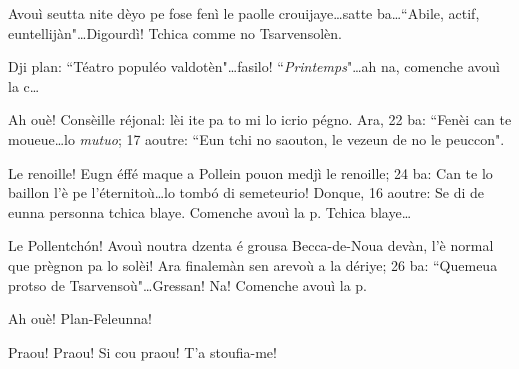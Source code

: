 


\DramPer


 

\begin{drama}

\Laurentspeaks Avouì seutta nite dèyo pe fose fenì le paolle crouijaye\ldots satte ba\ldots ``Abile, actif, euntellijàn"\ldots Digourdì! Tchica comme no Tsarvensolèn.


\Laurentspeaks Dji plan: ``Téatro populéo valdotèn"\ldots fasilo! ``\textit{Printemps}"\ldots ah na, comenche avouì la c\ldots


\Laurentspeaks Ah ouè! \og Consèille réjonal\fg: lèi ite pa to mi lo icrio pégno. Ara, 22 ba: ``Fenèi can te moueue\ldots lo \textit{mutuo}; 17 aoutre: ``Eun tchi no saouton, le vezeun de no le peuccon".


\Laurentspeaks Le renoille! Eugn éffé maque a Pollein pouon medjì le renoille; 24 ba: \og Can te lo baillon l'è pe l'éternitoù\fg\ldots lo tomb\'o di semeteurio! Donque, 16 aoutre: \og Se di de eunna personna tchica blaye\fg. Comenche avouì la p. Tchica blaye\ldots


\Laurentspeaks Le Pollentch\'on! Avouì noutra dzenta é grousa Becca-de-Noua devàn, l'è normal que prègnon pa lo solèi! Ara finalemàn sen arevoù a la dériye; 26 ba: ``Quemeua protso de Tsarvensoù"\ldots Gressan! Na! Comenche avouì la p.


\Laurentspeaks Ah ouè! Plan-Feleunna!


\Taniaspeaks{} Praou! Praou! Si cou praou! T'a stoufia-me!


\end{drama}
